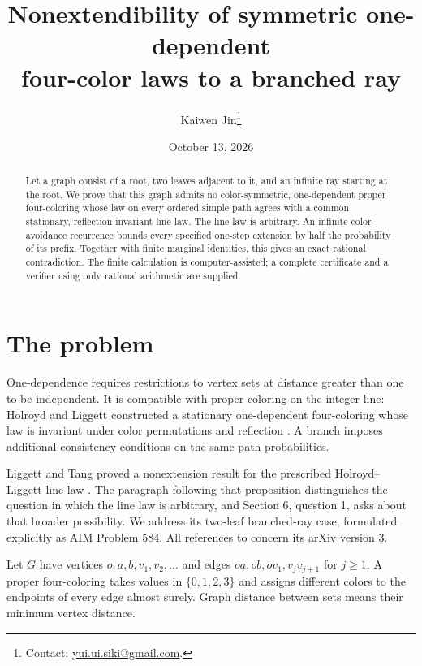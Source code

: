 \documentclass[11pt]{article}
\title{Nonextendibility of symmetric one-dependent\protect\\
four-color laws to a branched ray}
\author{Kaiwen Jin\thanks{Contact: \href{mailto:yui.ui.siki@gmail.com}{yui.ui.siki@gmail.com}.}}
\date{October 13, 2026}
\newcommand{\C}{\{0,1,2,3\}}
\begin{document}
\maketitle
\begin{abstract}
Let a graph consist of a root, two leaves adjacent to it, and an infinite
ray starting at the root. We prove that this graph admits no color-symmetric,
one-dependent proper four-coloring whose law on every ordered simple path
agrees with a common stationary, reflection-invariant line law. The line law
is arbitrary. An infinite color-avoidance recurrence bounds every specified
one-step extension by half the probability of its prefix. Together with
finite marginal identities, this gives an exact rational contradiction.
The finite calculation is computer-assisted; a complete certificate and a
verifier using only rational arithmetic are supplied.
\end{abstract}

\section{The problem}
One-dependence requires restrictions to vertex sets at distance greater than
one to be independent. It is compatible with proper coloring on the integer
line: Holroyd and Liggett constructed a stationary one-dependent four-coloring
whose law is invariant under color permutations and reflection
\cite[Theorem 4]{HL}. A branch imposes additional consistency conditions on
the same path probabilities.

Liggett and Tang proved a nonextension result for the prescribed
Holroyd--Liggett line law \cite[Proposition 1.4]{LT}. The paragraph following
that proposition distinguishes the question in which the line law is
arbitrary, and Section 6, question 1, asks about that broader possibility.
We address its two-leaf branched-ray case, formulated explicitly as
\href{https://github.com/MColbrook/AIM/blob/c9929805cece044705abaaebe1cebddac1ba11a6/problems/584-four-color-branched-ray.md}{AIM Problem 584}.
All references to \cite{LT} concern its arXiv version 3.

Let $G$ have vertices $o,a,b,v_1,v_2,\ldots$ and edges
$oa,ob,ov_1,v_jv_{j+1}$ for $j\geq1$. A proper four-coloring takes values
in $\C$ and assigns different colors to the endpoints of every edge almost
surely. Graph distance between sets means their minimum vertex distance.
\end{document}
